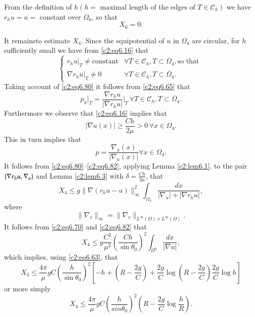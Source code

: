 From the definition of $h(h= \text{ maximal length of the edges of } T
\in \mathscr{C}_h )$ we have $r_h u = u=$ constant over
$\Omega_6$, so that 
\begin{equation}
X_6 =0. \tag{6.79}\label{c2:eq6.79} 
\end{equation}

 It remains\pageoriginale  to estimate $X_4$. Since the equipotential of $u$ in
 $\Omega_4$ are circular, for $h$ sufficiently small we have from
 \eqref{c2:eq6.16} that  
 \begin{equation}
\begin{cases}
r_h u|_T \neq \text{constant}&\forall T \in \mathscr{C}_h, T
\subset \overline{\Omega}_4, \text{so that }\\ 
\nabla r_h u|_T \neq 0 &\forall T \in \mathscr{C}_h, T
\subset \overline{\Omega}_4.\tag{6.80}\label{c2:eq6.80} 
\end{cases}
 \end{equation} 
 Taking account of \eqref{c2:eq6.80} it follows from \eqref{c2:eq6.65}
 that  
 \begin{equation}
 p_h |_T = \frac{\nabla r_h u}{|\nabla  r_h u|}\bigg|_T
\, \forall  T \in \mathscr{C}_h, T \subset
 \overline{\Omega}_4.\tag{6.81}\label{c2:eq6.81} 
 \end{equation} 
 Furthermore we observe that \eqref{c2:eq6.16} implies that 
 \begin{equation}
|\nabla u (x) | \geq \frac{Ch}{2 \mu}>0\, \forall  x \in
\Omega_4.\tag{6.82}\label{c2:eq6.82} 
 \end{equation} 
 This in turn implies that 
 $$
 p = \frac{\nabla _u (x) }{|\nabla _u (x)|}\forall x
 \in \Omega_4. 
 $$
 It follows from \eqref{c2:eq6.80}--\eqref{c2:eq6.82}, applying Lemma
 \ref{c2:lem6.1}. to the pair 
 $\{\nabla r_h u,\break \nabla _u\}$ and Lemma \ref{c2:lem6.3} with 
 $\delta = \frac{Ch}{2\mu}$, that   
 $$
 X_4 \leq g \parallel \nabla (r_hu-u)\parallel^2 _\infty \int_{\Omega_4}
 \frac{dx}{|\nabla _u | +| \nabla r_h u|}, 
 $$
 where 
 $$
 \parallel \nabla _v\parallel_\infty = \parallel \nabla_v\parallel_{L^\infty (\Omega)
   \times L^\infty (\Omega)}. 
 $$
  It follows from \eqref{c2:eq6.70} and \eqref{c2:eq6.82} that   
 $$
 X_4 \leq g \frac{C^2}{\mu^2} \left(\frac{Ch}{\sin \theta_0}\right)^2
 \int_{\Omega^0} \frac{dx}{|\nabla u|}, 
 $$
 which implies, using \eqref{c2:eq6.63}, that 
 $$
 X_4 \leq \frac{4\pi}{\mu}g C \left(\frac{h}{\sin \theta_0}\right)^2
 \left[-h+ \left(R-\frac{2g}{C}\right) + \frac{2g}{C}\log
   \left(R-\frac{2g}{C}\right) \frac{2g}{C}\log h \right] 
 $$
 or more simply 
 \begin{equation}
X_4 \leq \frac{4\pi}{\mu} g C \left(\frac{h}{sin \theta_0}\right)^2
\left(R-\frac{2g}{C}\log \frac{h}{R}\right).\tag{6.83}\label{c2:eq6.83} 
 \end{equation}\pageoriginale  
 
